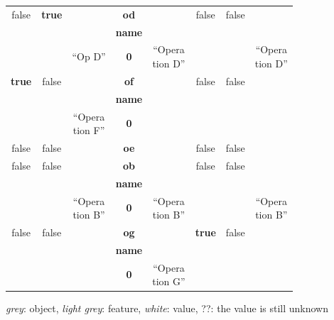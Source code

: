 \documentclass{llncs}
\begin{document}
\begin{table}
\begin{footnotesize}
\begin{tabular}{  c  c  c  c  c  c  c  c  }
            \hline
            \rowcolor{gray1}
            false & \textbf{true} & & \textbf{\textsf{od}} & & false & false & \\
            \rowcolor{gray2}
            & & & \textbf{\textsf{name}} & & & & \\
            & & ``Op D'' & \textbf{0} & \makecell{``Opera\\tion D''} & & & \makecell{``Opera\\tion D''} \\
            \hline
            \rowcolor{gray1}
            \textbf{true} & false & & \textbf{\textsf{of}} & & false & false & \\
            \rowcolor{gray2}
            & & & \textbf{\textsf{name}} & & & & \\
            & & \makecell{``Opera\\tion F''} & \textbf{0} & & & &  \\
            \hline
            \rowcolor{gray1}
            false & false & & \textbf{\textsf{oe}} & & false & false & \\
            \hline
            \rowcolor{gray1}
            false & false & & \textbf{\textsf{ob}} & & false & false & \\
            \rowcolor{gray2}
            & & & \textbf{\textsf{name}} & & & & \\
            & & \makecell{``Opera\\tion B''} & \textbf{0} & \makecell{``Opera\\tion B''} & & & \makecell{``Opera\\tion B''}\\
            \hline
            \rowcolor{gray1}
            false & false & & \textbf{\textsf{og}} & & \textbf{true} & false & \\
            \rowcolor{gray2}
            & & & \textbf{\textsf{name}} & & & & \\
            & &  & \textbf{0} & \makecell{``Opera\\tion G''} & & & \\
            \hline
        \end{tabular}
        \begin{flushright}
            \textit{grey}: object, \textit{light grey}: feature, \textit{white}: value, ??: the value is still unknown
        \end{flushright}
    \end{footnotesize}
\end{table}
\end{document}
